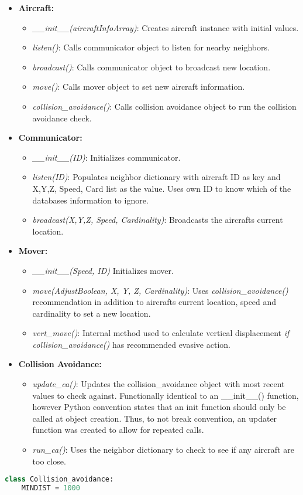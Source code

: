 \documentclass[12pt]{report}
\theoremstyle{plain}
\theoremstyle{definition}
\begin{document}
\begin{itemize}
\item \textbf{Aircraft:} \begin{itemize}
\item\textit{\_\_init\_\_(aircraftInfoArray)}: Creates aircraft instance with initial values.
\item\textit{listen()}: Calls communicator object to listen for nearby neighbors.
\item\textit{broadcast()}: Calls communicator object to broadcast new location.
\item\textit{move()}: Calls mover object to set new aircraft information.
\item\textit{collision\_avoidance()}: Calls collision avoidance object to run the collision avoidance check.
\end{itemize}
\item \textbf{Communicator:} \begin{itemize}
\item\textit{\_\_init\_\_(ID)}: Initializes communicator.
\item\textit{listen(ID)}: Populates neighbor dictionary with aircraft ID as key and X,Y,Z, Speed, Card list as the value. Uses own ID to know which of the databases information to ignore.
\item\textit{broadcast(X,Y,Z, Speed, Cardinality)}: Broadcasts the aircrafts current location.
\end{itemize}
\item \textbf{Mover:} \begin{itemize}
\item\textit{\_\_init\_\_(Speed, ID)} Initializes mover.
\item\textit{move(AdjustBoolean, X, Y, Z, Cardinality)}: Uses \textit{collision\_avoidance()} recommendation in addition to aircrafts current location, speed and cardinality to set a new location.
\item\textit{vert\_move()}: Internal method used to calculate vertical displacement \textit{if collision\_avoidance()} has recommended evasive action.
\end{itemize}
\item \textbf{Collision Avoidance:} \begin{itemize}
\item\textit{update\_ca()}: Updates the collision\_avoidance object with most recent values to check against. Functionally identical to an \_\_init\_\_() function, however Python convention states that an init function should only be called at object creation.  Thus, to not break convention, an updater function was created to allow for repeated calls.
\item\textit{run\_ca()}: Uses the neighbor dictionary to check to see if any aircraft are too close.
\end{itemize}
\end{itemize}\begin{lstlisting}[language =Python]
class Collision_avoidance:
    MINDIST = 1000


\end{lstlisting}
\end{document}
